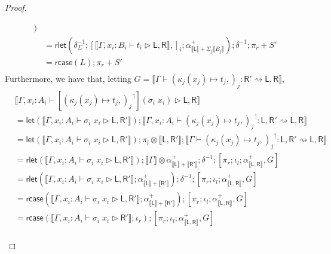 \documentclass[acmsmall,screen,review]{acmart}
\newcommand{\ms}[1]{\ensuremath{\mathsf{#1}}}
\newcommand{\lupg}[1]{{#1}^\upharpoonleft}
\newcommand{\bhyp}[2]{#1 : #2}
\newcommand{\haslb}[3]{#1 \vdash #2 \rhd #3}
\newcommand{\lbsubst}[4]{#1 \vdash #2: #3 \rightsquigarrow #4}
\newcommand{\dnt}[1]{\llbracket{#1}\rrbracket}
\newcommand{\lmor}[1]{\ms{let}(#1)}
\newcommand{\rlmor}[1]{\ms{rlet}(#1)}
\newcommand{\rcase}[1]{\ms{rcase}(#1)}
\begin{document}
\begin{proof}
\begin{itemize}[leftmargin=*]
\begin{equation}
\begin{aligned}
          )
           \\
        & = \rlmor{
            \delta^{-1}_\Sigma
            ; [ \dnt{\haslb{\Gamma, \bhyp{x_i}{B_i}}{t_i}{\ms{L}, \ms{R}}},]_i
            ; \alpha^+_{\dnt{\ms{L}} + \Sigma_j\dnt{B_j}}}
          ; \delta^{-1} ; \pi_r + S'
          \\
        & = \rcase{L} ; \pi_r + S'
          \\
      \end{aligned}
    \end{equation}
    Furthermore, we have that, letting 
    $G = \dnt{\lbsubst{\Gamma}{(\kappa_j(x_j) \mapsto t_j,)_j}{\ms{R}'}{\ms{L}, \ms{R}}}$,
    \begin{equation}
      \begin{aligned}
        & \dnt{\haslb
          {\Gamma, \bhyp{x_i}{A_i}}{[\lupg{(\kappa_j(x_j) \mapsto t_j,)_j}](\sigma_i\;x_i)}
          {\ms{L}, \ms{R}}} \\
        & = \lmor{\dnt{\haslb{\Gamma, \bhyp{x_i}{A_i}}{\sigma_i\;x_i}{\ms{L}, \ms{R}'}}}
          ; \dnt{\lbsubst{\Gamma, \bhyp{x_i}{A_i}}{\lupg{(\kappa_j(x_j) \mapsto t_j,)_j}}
            {\ms{L}, \ms{R}'}{\ms{L}, \ms{R}}} \\
        & = \lmor{\dnt{\haslb{\Gamma, \bhyp{x_i}{A_i}}{\sigma_i\;x_i}{\ms{L}, \ms{R}'}}}
          ; \pi_l \otimes \dnt{\ms{L}, \ms{R'}} 
          ; \dnt{\lbsubst{\Gamma}{\lupg{(\kappa_j(x_j) \mapsto t_j,)_j}}
            {\ms{L}, \ms{R}'}{\ms{L}, \ms{R}}} \\
        & = \rlmor{\dnt{\haslb{\Gamma, \bhyp{x_i}{A_i}}{\sigma_i\;x_i}{\ms{L}, \ms{R}'}}}
        ; \dnt{\Gamma} \otimes \alpha^+_{\dnt{\ms{L}} + \dnt{\ms{R}'}}
        ; \delta^{-1}
        ; [\pi_r ; \iota_l ; \alpha^+_{\dnt{\ms{L}, \ms{R}}} , G]
         \\
        & = \rlmor{
          \dnt{\haslb{\Gamma, \bhyp{x_i}{A_i}}{\sigma_i\;x_i}{\ms{L}, \ms{R}'}}
          ; \alpha^+_{\dnt{\ms{L}} + \dnt{\ms{R}'}}
        } ; \delta^{-1} 
        ; [\pi_r ; \iota_l ; \alpha^+_{\dnt{\ms{L}, \ms{R}}} , G] \\
        & = \rcase{
          \dnt{\haslb{\Gamma, \bhyp{x_i}{A_i}}{\sigma_i\;x_i}{\ms{L}, \ms{R}'}}
          ; \alpha^+_{\dnt{\ms{L}} + \dnt{\ms{R}'}}
        }
        ; [\pi_r ; \iota_l ; \alpha^+_{\dnt{\ms{L}, \ms{R}}} , G] \\
        & = \rcase{
          \dnt{\haslb{\Gamma, \bhyp{x_i}{A_i}}{\sigma_i\;x_i}{\ms{R}'}}
          ; \iota_r
        }
        ; [\pi_r ; \iota_l ; \alpha^+_{\dnt{\ms{L}, \ms{R}}} , G] \\

\end{aligned}
\end{equation}
\end{itemize}
\end{proof}
\end{document}
